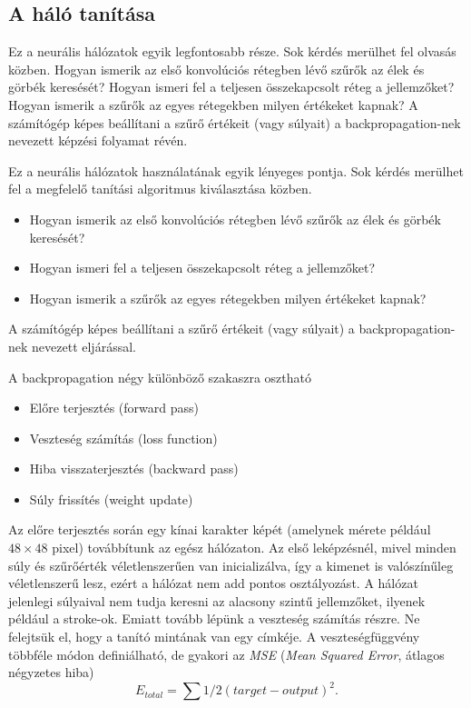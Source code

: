 \subsection{A háló tanítása}

Ez a neurális hálózatok egyik legfontosabb része. Sok kérdés merülhet fel olvasás közben. Hogyan ismerik az első konvolúciós rétegben lévő szűrők az élek és görbék keresését? Hogyan ismeri fel a teljesen összekapcsolt réteg a jellemzőket? Hogyan ismerik a szűrők az egyes rétegekben milyen értékeket kapnak? A számítógép képes beállítani a szűrő értékeit (vagy súlyait) a backpropagation-nek nevezett képzési folyamat révén.

Ez a neurális hálózatok használatának egyik lényeges pontja. Sok kérdés merülhet fel a megfelelő tanítási algoritmus kiválasztása közben.
\begin{itemize}
\item Hogyan ismerik az első konvolúciós rétegben lévő szűrők az élek és görbék keresését?
\item Hogyan ismeri fel a teljesen összekapcsolt réteg a jellemzőket?
\item Hogyan ismerik a szűrők az egyes rétegekben milyen értékeket kapnak?
\end{itemize}
A számítógép képes beállítani a szűrő értékeit (vagy súlyait) a backpropagation-nek nevezett eljárással.

A backpropagation\cite{ABeginne32} négy különböző szakaszra osztható
\begin{itemize}
\item Előre terjesztés (forward pass)
\item Veszteség számítás (loss function)
\item Hiba visszaterjesztés (backward pass)
\item Súly frissítés (weight update)
\end{itemize}

Az előre terjesztés során egy kínai karakter képét (amelynek mérete például $48 \times 48$ pixel) továbbítunk az egész hálózaton. Az első leképzésnél, mivel minden súly és szűrőérték véletlenszerűen van inicializálva, így a kimenet is valószínűleg véletlenszerű lesz, ezért a hálózat nem add pontos osztályozást. A hálózat jelenlegi súlyaival nem tudja keresni az alacsony szintű jellemzőket, ilyenek például a stroke-ok. Emiatt tovább lépünk a veszteség számítás részre. Ne felejtsük el, hogy a tanító mintának van egy címkéje. A veszteségfüggvény többféle módon definiálható, de gyakori az \textit{MSE} (\textit{Mean Squared Error}, átlagos négyzetes hiba)
$$
E_{total} = \sum 1/2(target - output)^2.
$$ 

